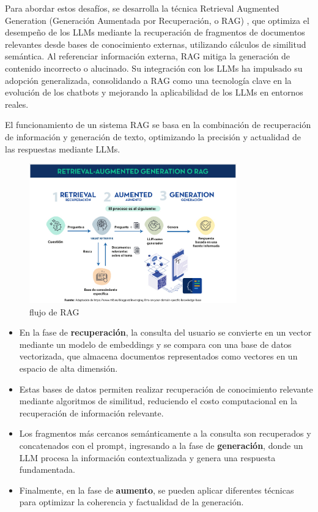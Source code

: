 Para abordar estos desafíos, se desarrolla la técnica Retrieval Augmented Generation (Generación Aumentada por Recuperación, o RAG) \cite{lewis2021retrievalaugmentedgenerationknowledgeintensivenlp}, que optimiza el desempeño de los LLMs mediante la recuperación de fragmentos de documentos relevantes desde bases de conocimiento externas, utilizando cálculos de similitud semántica. 
Al referenciar información externa, RAG mitiga la generación de contenido incorrecto o alucinado. 
Su integración con los LLMs ha impulsado su adopción generalizada, consolidando a RAG como una tecnología clave en la evolución de los chatbots y mejorando la aplicabilidad de los LLMs en entornos reales.

\newpage
El funcionamiento de un sistema RAG se basa en la combinación de recuperación de información y generación de texto, optimizando la precisión y actualidad de las respuestas mediante LLMs. 

\begin{figure}[h]
	\centering
	\includegraphics[width=0.8\textwidth]{figs/rag.png}
	\caption{flujo de RAG}
	\label{fig:context-anoni1}
\end{figure}


\begin{itemize}
    \item En la fase de \textbf{recuperación}, la consulta del usuario se convierte en un vector mediante un modelo de embeddings y se compara con una base de datos vectorizada, que almacena documentos representados como vectores en un espacio de alta dimensión.
    \item Estas bases de datos permiten realizar recuperación de conocimiento relevante mediante algoritmos de similitud, reduciendo el costo computacional en la recuperación de información relevante.
    \item Los fragmentos más cercanos semánticamente a la consulta son recuperados y concatenados con el prompt, ingresando a la fase de \textbf{generación}, donde un LLM procesa la información contextualizada y genera una respuesta fundamentada.
    \item Finalmente, en la fase de \textbf{aumento}, se pueden aplicar diferentes técnicas para optimizar la coherencia y factualidad de la generación.
\end{itemize}

